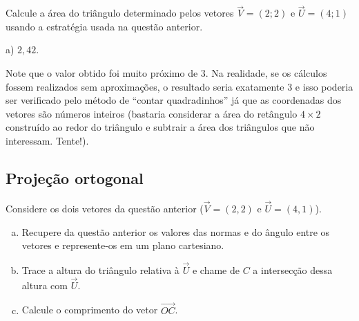 \documentclass[main.tex]{subfiles}
\begin{document}
\begin{questao}
 Calcule a área do triângulo determinado pelos vetores $\overrightarrow{V}=(2;2)$ e $\overrightarrow{U}=(4;1)$ usando a estratégia usada na questão anterior.
\end{questao}

\begin{gabarito}
	\begin{gabaritoQuestao}
		a) $2,42$.
	\end{gabaritoQuestao}
\end{gabarito}

Note que o valor obtido foi muito próximo de 3. Na realidade, se os cálculos fossem realizados sem aproximações, o resultado seria exatamente 3 e isso poderia ser verificado pelo método de ``contar quadradinhos'' já que as coordenadas dos vetores são números inteiros (bastaria considerar a área do retângulo $4 \times 2$ construído ao redor do triângulo e subtrair a área dos triângulos que não interessam. Tente!).

\subsection*{Projeção ortogonal}

\begin{questao}
Considere os dois vetores da questão anterior ($\overrightarrow{V}=(2,2)$ e $\overrightarrow{U}=(4,1)$).
\begin{enumerate}[a)]
\item Recupere da questão anterior os valores das normas e do ângulo entre os vetores e represente-os em um plano cartesiano.
\item Trace a altura do triângulo relativa à $\overrightarrow{U}$ e chame de $C$ a intersecção dessa altura com $\overrightarrow{U}$.
\item Calcule o comprimento do vetor $\overrightarrow{OC}$.
\end{enumerate}
\end{questao}
\end{document}
